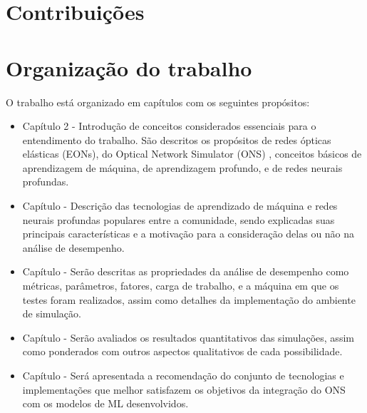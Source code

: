 \section{Contribuições}
\label{intro-contributions}

\section{Organização do trabalho}
\label{intro-org}

O trabalho está organizado em \todo[?] capítulos com os seguintes propósitos:

\begin{itemize}
  \item Capítulo 2 - Introdução de conceitos considerados essenciais para o entendimento do trabalho. São descritos os propósitos de redes ópticas elásticas (EONs), do Optical Network Simulator (ONS) \cite{costa2016ons}, conceitos básicos de aprendizagem de máquina, de aprendizagem profundo, e de redes neurais profundas.

  \item Capítulo \todo[?] - Descrição das tecnologias de aprendizado de máquina e redes neurais profundas populares entre a comunidade, sendo explicadas suas principais características e a motivação para a consideração delas ou não na análise de desempenho.

  \item Capítulo \todo[análise] - Serão descritas as propriedades da análise de desempenho como métricas, parâmetros, fatores, carga de trabalho, e a máquina em que os testes foram realizados, assim como detalhes da implementação do ambiente de simulação.

  \item Capítulo \todo[resultados] - Serão avaliados os resultados quantitativos das simulações, assim como ponderados com outros aspectos qualitativos de cada possibilidade.

  \item Capítulo \todo[conclusão] - Será apresentada a recomendação do conjunto de tecnologias e implementações que melhor satisfazem os objetivos da integração do ONS com os modelos de ML desenvolvidos.
\end{itemize}




